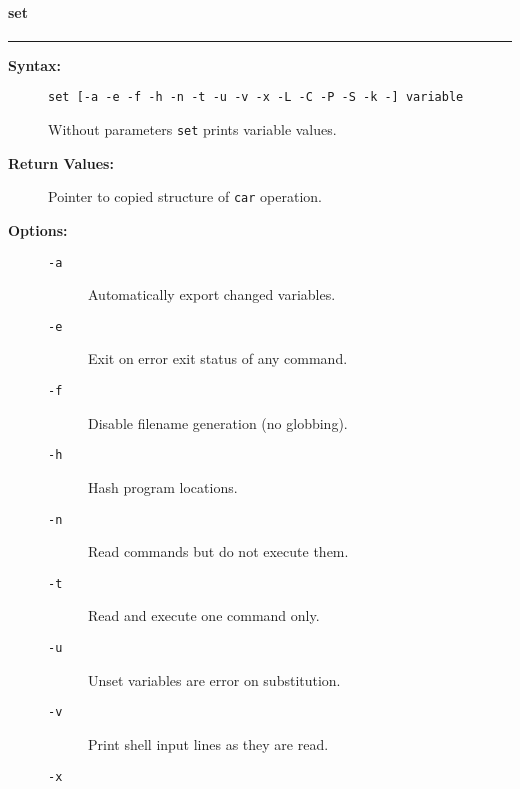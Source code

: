 \vspace {2pt}


\paragraph{set}

\hrule
\begin{description}
\item[{\bf Syntax:}] \mbox{}

{\tt set [-a -e -f -h -n -t -u -v -x -L -C -P -S -k -] variable}

Without parameters {\tt set} prints variable values.



\item[{\bf Return Values:}] \mbox{}

Pointer to copied structure of {\tt car} 
operation.

\item[{\bf Options:}] \mbox{}

\begin{description}
\item[{\tt -a}] \mbox{}

Automatically export changed variables.

\item[{\tt -e}] \mbox{}

Exit on error exit status of any command.

\item[{\tt -f}] \mbox{}

Disable filename generation (no globbing).

\item[{\tt -h}] \mbox{}

Hash program locations.

\item[{\tt -n}] \mbox{}

Read commands but do not execute them.

\item[{\tt -t}] \mbox{}

Read and execute one command only.

\item[{\tt -u}] \mbox{}

Unset variables are error on substitution.

\item[{\tt -v}] \mbox{}

Print shell input lines as they are read.

\item[{\tt -x}] \mbox{}


\end{description}
\end{description}
